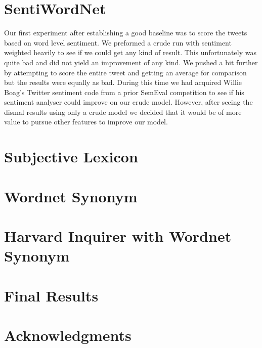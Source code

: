 \documentclass[11pt,letterpaper]{article}
\begin{document}
\section{SentiWordNet}


Our first experiment after establishing a good baseline was to score the tweets based on word level sentiment. We preformed a crude run with sentiment weighted heavily to see if we could get any kind of result. This unfortunately was quite bad and did not yield an improvement of any kind. We pushed a bit further by attempting to score the entire tweet and getting an average for comparison but the results were equally as bad. During this time we had acquired Willie Boag's Twitter sentiment code from a prior SemEval competition to see if his sentiment analyser could improve on our crude model. However, after seeing the dismal results using only a crude model we decided that it would be of more value to pursue other features to improve our model.

\section{Subjective Lexicon}


\section{Wordnet Synonym}


\section{Harvard Inquirer with Wordnet Synonym}

\section{Final Results}


\section*{Acknowledgments}



\end{document}
